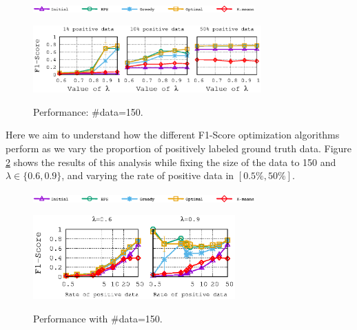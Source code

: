 
\begin{figure}[H]
\begin{centering}
\includegraphics[width=8.5cm]{imgs/legend1}
\par\end{centering}
\begin{centering}
{\includegraphics[width=8.75cm]{imgs/Twitter_results/f1_performance_posrate_Data_150}}\par\end{centering}
\caption{Performance: \#data=150.}
\label{fig:F1_vs_Lambda}
\end{figure}




 Here we aim to understand how the different F1-Score optimization algorithms perform as we vary the proportion of positively labeled ground truth data.
Figure \ref{fig:F1_vs_Pos_Twitter} shows the results of this analysis while fixing the size of the data to 150 and $\lambda\in \{0.6,0.9\}$, and varying the rate of positive data in $[0.5\%,50\%]$.


\begin{figure}[H]
\begin{centering}
\includegraphics[width=8.5cm]{imgs/legend1}
\par\end{centering}
\begin{centering}
{\includegraphics[width=7.75cm]{imgs/Twitter_results/f1_performance_Data_150}}
\par\end{centering}
\caption{Performance with \#data=150.}
\label{fig:F1_vs_Pos_Twitter}
\end{figure}

